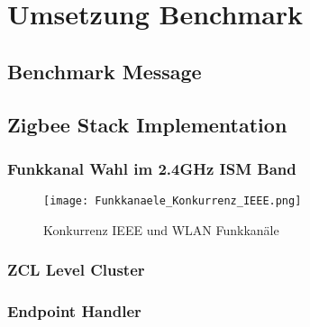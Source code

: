 \clearpage
\section{Umsetzung Benchmark}\label{sec:UmsetzungBenchmark}



\subsection{Benchmark Message}\label{subsec:BenchmarkMessage}

\subsection{Zigbee Stack Implementation}\label{subsec:ZigbeeStackImplementation}

\subsubsection{Funkkanal Wahl im 2.4GHz ISM Band}\label{subsubsec:FunkkanalWahlim2.4GHzISMBand}

\begin{figure}[h]
	\centering
	\texttt{[image: Funkkanaele\_Konkurrenz\_IEEE.png]}
	\caption{Konkurrenz IEEE und WLAN Funkkanäle \cite{markus_krause_rainer_konrad_drahtlose_2014}}
	\label{fig:KonkurrenzIEEEundWLANFunkkanäle}
\end{figure}

\subsubsection{ZCL Level Cluster}\label{subsubsec:ZCLLevelCluster}

\subsubsection{Endpoint Handler}\label{subsubsec:EndpointHandler}

